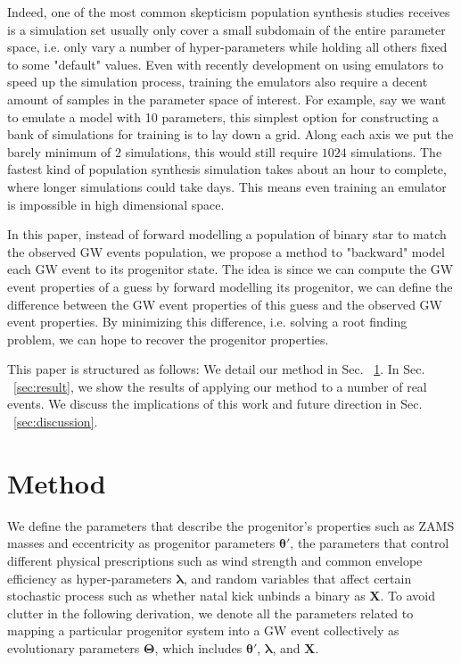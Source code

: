 \documentclass[twocolumn]{aastex631}
\begin{document}
Indeed, one of the most common skepticism population synthesis studies receives is a simulation set usually only cover a small subdomain of the entire parameter space,
i.e. only vary a number of hyper-parameters while holding all others fixed to some "default" values.
Even with recently development on using emulators to speed up the simulation process, training the emulators also require a decent amount of samples in the parameter space of interest.
For example, say we want to emulate a model with 10 parameters, this simplest option for constructing a bank of simulations for training is to lay down a grid. Along each axis we put the barely minimum of $2$ simulations, this would still require $1024$ simulations.
The fastest kind of population synthesis simulation takes about an hour to complete, where longer simulations could take days.
This means even training an emulator is impossible in high dimensional space.

In this paper, instead of forward modelling a population of binary star to match the observed GW events population,
we propose a method to "backward" model each GW event to its progenitor state.
The idea is since we can compute the GW event properties of a guess by forward modelling its progenitor,
we can define the difference between the GW event properties of this guess and the observed GW event properties.
By minimizing this difference, i.e. solving a root finding problem, we can hope to recover the progenitor properties.

This paper is structured as follows: We detail our method in Sec. ~\ref{sec:method}.
In Sec. ~\ref{sec:result}, we show the results of applying our method to a number of real events.
We discuss the implications of this work and future direction in Sec. ~\ref{sec:discussion}.

\section{Method}
\label{sec:method}

We define the parameters that describe the progenitor's properties such as ZAMS masses and eccentricity as progenitor parameters $\bm{\theta'}$,
the parameters that control different physical prescriptions such as wind strength and common envelope efficiency as hyper-parameters $\bm{\lambda}$,
and random variables that affect certain stochastic process such as whether natal kick unbinds a binary as $\bm{X}$.
To avoid clutter in the following derivation,
we denote all the parameters related to mapping a particular progenitor system into a GW event collectively as evolutionary parameters $\bm{\Theta}$,
which includes $\bm{\theta'}$, $\bm{\lambda}$, and $\bm{X}$.
\end{document}
